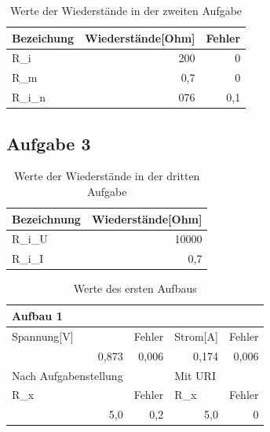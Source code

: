 \documentclass[12pt]{scrartcl}
\begin{document}
\begin{table}[htbp]
\caption{Werte der Wiederstände in der zweiten Aufgabe}
\begin{tabular}{|l|r|r|}
\hline
Bezeichung & \multicolumn{1}{l|}{Wiederstände[Ohm]} & \multicolumn{1}{l|}{Fehler} \\ \hline
R\_i & 200 & 0 \\ \hline
R\_m & 0,7 & 0 \\ \hline
R\_i\_n & 076 & 0,1 \\ \hline
\end{tabular}
\label{aufgabe_2_Wiederstände}
\end{table}

\newpage

\subsection{Aufgabe 3}

\begin{table}[htbp]
\caption{Werte der Wiederstände in der dritten Aufgabe}
\begin{tabular}{|l|r|}
\hline
Bezeichnung & \multicolumn{1}{l|}{Wiederstände[Ohm]} \\ \hline
R\_i\_U & 10000 \\ \hline
R\_i\_I & 0,7 \\ \hline
\end{tabular}
\label{aufgabe_3_Wiederstände}
\end{table}

\begin{table}[htbp]
\caption{Werte des ersten Aufbaus}
\begin{tabular}{|l|l|l|l|}
\hline
Aufbau 1 &  &  &  \\ \hline
Spannung[V] & Fehler & Strom[A] & Fehler \\ \hline
\multicolumn{1}{|r|}{0,873} & \multicolumn{1}{r|}{0,006} & \multicolumn{1}{r|}{0,174} & \multicolumn{1}{r|}{0,006} \\ \hline
Nach Aufgabenstellung &  & Mit URI &  \\ \hline
R\_x & Fehler & R\_x & Fehler \\ \hline
\multicolumn{1}{|r|}{5,0} & \multicolumn{1}{r|}{0,2} & \multicolumn{1}{r|}{5,0} & \multicolumn{1}{r|}{0} \\ \hline
\end{tabular}
\label{aufgabe_3_aufbau_1}
\end{table}
\end{document}
